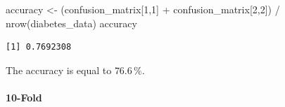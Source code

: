 \documentclass[
]{article}
\newenvironment{Shaded}{\begin{snugshade}}{\end{snugshade}}
\newcommand{\DecValTok}[1]{\textcolor[rgb]{0.00,0.00,0.81}{#1}}
\newcommand{\FunctionTok}[1]{\textcolor[rgb]{0.00,0.00,0.00}{#1}}
\newcommand{\NormalTok}[1]{#1}
\newcommand{\OtherTok}[1]{\textcolor[rgb]{0.56,0.35,0.01}{#1}}
\newcommand{\SpecialCharTok}[1]{\textcolor[rgb]{0.00,0.00,0.00}{#1}}
\begin{document}
\begin{Shaded}
\begin{Highlighting}[]
\NormalTok{accuracy }\OtherTok{\textless{}{-}}\NormalTok{ (confusion\_matrix[}\DecValTok{1}\NormalTok{,}\DecValTok{1}\NormalTok{] }\SpecialCharTok{+}\NormalTok{ confusion\_matrix[}\DecValTok{2}\NormalTok{,}\DecValTok{2}\NormalTok{]) }\SpecialCharTok{/} \FunctionTok{nrow}\NormalTok{(diabetes\_data)}
\NormalTok{accuracy}
\end{Highlighting}
\end{Shaded}

\begin{verbatim}
[1] 0.7692308
\end{verbatim}

The accuracy is equal to \(76.6\,\%\).

\hypertarget{fold}{%
\paragraph{10-Fold}\label{fold}}
\end{document}
